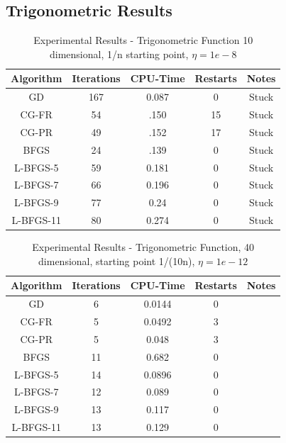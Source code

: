 \documentclass[12pt]{amsart}
\begin{document}
\subsection{Trigonometric Results}
\begin{table}
\caption{Experimental Results - Trigonometric Function 10 dimensional, 1/n starting point, $\eta=1e-8$}
\label{results_table}
\begin{center}
\begin{tabular}{|c||c||c||c||c|}
\hline
Algorithm & Iterations & CPU-Time & Restarts & Notes\\
\hline
GD & 167 & 0.087 & 0 & Stuck\\
\hline
CG-FR & 54 & .150 & 15 & Stuck\\
\hline
CG-PR & 49 & .152 & 17 & Stuck\\
\hline
BFGS & 24 & .139 & 0 & Stuck\\
\hline
L-BFGS-5 & 59 & 0.181 & 0 & Stuck\\
\hline
L-BFGS-7 & 66 & 0.196 & 0 & Stuck\\
\hline
L-BFGS-9 & 77 & 0.24 & 0 & Stuck \\
\hline
L-BFGS-11 & 80 & 0.274 & 0 & Stuck\\
\hline
\end{tabular}
\end{center}
\end{table}
\begin{table}
\caption{Experimental Results - Trigonometric Function, 40 dimensional, starting point 1/(10n), $\eta=1e-12$}
\label{results_table}
\begin{center}
\begin{tabular}{|c||c||c||c||c|}
\hline
Algorithm & Iterations & CPU-Time & Restarts & Notes\\
\hline
GD & 6 & 0.0144 & 0 & \\
\hline
CG-FR & 5 & 0.0492 & 3 & \\
\hline
CG-PR & 5 & 0.048 & 3 & \\
\hline
BFGS & 11 & 0.682 & 0 & \\
\hline
L-BFGS-5 & 14 & 0.0896 & 0 &\\
\hline
L-BFGS-7 & 12 & 0.089 & 0 &\\
\hline
L-BFGS-9 & 13 & 0.117 & 0 &\\
\hline
L-BFGS-11 & 13 & 0.129 & 0 &\\
\hline
\end{tabular}
\end{center}
\end{table}
\end{document}
